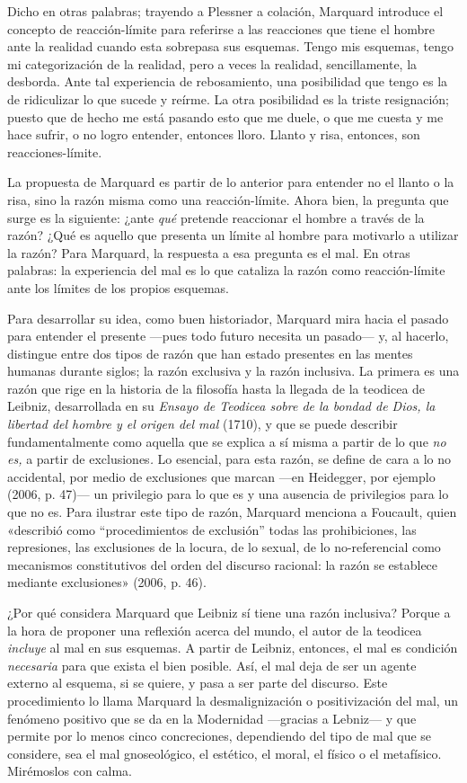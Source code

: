 \begin{refsection}
Dicho en otras palabras; trayendo a Plessner a colación, Marquard introduce el concepto de reacción-límite para referirse a las reacciones que tiene el hombre ante la realidad cuando esta sobrepasa sus esquemas. Tengo mis esquemas, tengo mi categorización de la realidad, pero a veces la realidad, sencillamente, la desborda. Ante tal experiencia de rebosamiento, una posibilidad que tengo es la de ridiculizar lo que sucede y reírme. La otra posibilidad es la triste resignación; puesto que de hecho me está pasando esto que me duele, o que me cuesta y me hace sufrir, o no logro entender, entonces lloro. Llanto y risa, entonces, son reacciones-límite.

La propuesta de Marquard es partir de lo anterior para entender no el llanto o la risa, sino la razón misma como una reacción-límite. Ahora bien, la pregunta que surge es la siguiente: ¿ante \emph{qué} pretende reaccionar el hombre a través de la razón? ¿Qué es aquello que presenta un límite al hombre para motivarlo a utilizar la razón? Para Marquard, la respuesta a esa pregunta es el mal. En otras palabras: la experiencia del mal es lo que cataliza la razón como reacción-límite ante los límites de los propios esquemas.

Para desarrollar su idea, como buen historiador, Marquard mira hacia el pasado para entender el presente ---pues todo futuro necesita un pasado--- y, al hacerlo, distingue entre dos tipos de razón que han estado presentes en las mentes humanas durante siglos; la razón exclusiva y la razón inclusiva. La primera es una razón que rige en la historia de la filosofía hasta la llegada de la teodicea de Leibniz, desarrollada en su \emph{Ensayo de Teodicea sobre de la bondad de Dios, la libertad del hombre y el origen del mal} (1710), y que se puede describir fundamentalmente como aquella que se explica a sí misma a partir de lo que \emph{no es,} a partir de exclusiones\emph{.} Lo esencial, para esta razón, se define de cara a lo no accidental, por medio de exclusiones que marcan ---en Heidegger, por ejemplo (2006, p. 47)--- un privilegio para lo que es y una ausencia de privilegios para lo que no es. Para ilustrar este tipo de razón, Marquard menciona a Foucault, quien «describió como ``procedimientos de exclusión'' todas las prohibiciones, las represiones, las exclusiones de la locura, de lo sexual, de lo no-referencial como mecanismos constitutivos del orden del discurso racional: la razón se establece mediante exclusiones» (2006, p. 46).

¿Por qué considera Marquard que Leibniz sí tiene una razón inclusiva? Porque a la hora de proponer una reflexión acerca del mundo, el autor de la teodicea \emph{incluye} al mal en sus esquemas. A partir de Leibniz, entonces, el mal es condición \emph{necesaria} para que exista el bien posible. Así, el mal deja de ser un agente externo al esquema, si se quiere, y pasa a ser parte del discurso. Este procedimiento lo llama Marquard la desmalignización o positivización del mal, un fenómeno positivo que se da en la Modernidad ---gracias a Lebniz--- y que permite por lo menos cinco concreciones, dependiendo del tipo de mal que se considere, sea el mal gnoseológico, el estético, el moral, el físico o el metafísico. Mirémoslos con calma.


\end{refsection}
